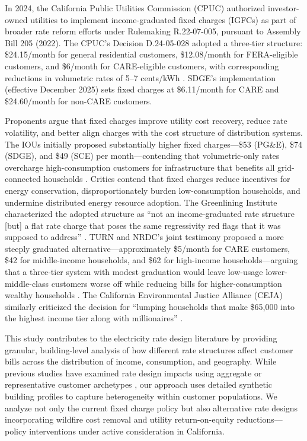 \documentclass[12pt]{article}
\begin{document}
In 2024, the California Public Utilities Commission (CPUC) authorized investor-owned utilities to implement income-graduated fixed charges (IGFCs) as part of broader rate reform efforts under Rulemaking R.22-07-005, pursuant to Assembly Bill 205 (2022). The CPUC's Decision D.24-05-028 adopted a three-tier structure: \$24.15/month for general residential customers, \$12.08/month for FERA-eligible customers, and \$6/month for CARE-eligible customers, with corresponding reductions in volumetric rates of 5--7 cents/kWh \citep{CPUC_D2405028}. SDGE's implementation (effective December 2025) sets fixed charges at \$6.11/month for CARE and \$24.60/month for non-CARE customers.

Proponents argue that fixed charges improve utility cost recovery, reduce rate volatility, and better align charges with the cost structure of distribution systems. The IOUs initially proposed substantially higher fixed charges---\$53 (PG\&E), \$74 (SDGE), and \$49 (SCE) per month---contending that volumetric-only rates overcharge high-consumption customers for infrastructure that benefits all grid-connected households \citep{JointIOUs_R2207005}. Critics contend that fixed charges reduce incentives for energy conservation, disproportionately burden low-consumption households, and undermine distributed energy resource adoption. The Greenlining Institute characterized the adopted structure as ``not an income-graduated rate structure [but] a flat rate charge that poses the same regressivity red flags that it was supposed to address'' \citep{Greenlining2024}. TURN and NRDC's joint testimony proposed a more steeply graduated alternative---approximately \$5/month for CARE customers, \$42 for middle-income households, and \$62 for high-income households---arguing that a three-tier system with modest graduation would leave low-usage lower-middle-class customers worse off while reducing bills for higher-consumption wealthy households \citep{NRDC_TURN_01}. The California Environmental Justice Alliance (CEJA) similarly criticized the decision for ``lumping households that make \$65,000 into the highest income tier along with millionaires'' \citep{CEJA2024}.

This study contributes to the electricity rate design literature by providing granular, building-level analysis of how different rate structures affect customer bills across the distribution of income, consumption, and geography. While previous studies have examined rate design impacts using aggregate or representative customer archetypes \citep{[citations]}, our approach uses detailed synthetic building profiles to capture heterogeneity within customer populations. We analyze not only the current fixed charge policy but also alternative rate designs incorporating wildfire cost removal and utility return-on-equity reductions---policy interventions under active consideration in California.
\end{document}
